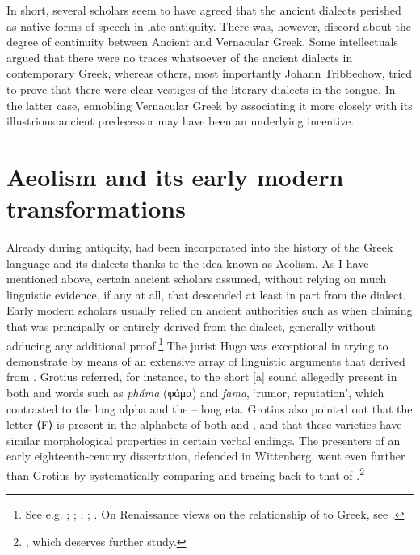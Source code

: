 In short, several scholars seem to have agreed that the ancient dialects perished as native forms of speech in late antiquity. There was, however, discord about the degree of continuity between Ancient and Vernacular Greek. Some intellectuals argued that there were no traces whatsoever of the ancient dialects in contemporary Greek, whereas others, most importantly Johann Tribbechow, tried to prove that there were clear vestiges of the literary dialects in the  tongue. In the latter case, ennobling Vernacular Greek by associating it more closely with its illustrious ancient predecessor may have been an underlying incentive.

\section{Aeolism and its early modern transformations}\label{sec:5.6}

Already during antiquity,  had been incorporated into the history of the Greek language and its dialects thanks to the idea known as Aeolism. As I have mentioned above, certain ancient scholars assumed, without relying on much linguistic evidence, if any at all, that  descended at least in part from the  dialect. Early modern scholars usually relied on ancient authorities such as  when claiming that  was principally or entirely derived from the  dialect, generally without adducing any additional proof.\footnote{See e.g. \citet[84]{Crinesius1629}; \citet[\textsc{xvii}]{Bentley1726}; \citet[76, 106]{Hemsterhuis2015}; \citet[30]{Munthe1748}; \citet[215--216]{Simonis1752}. On Renaissance views on the relationship of  to Greek, see \citet{Tavoni1986}.} The  jurist Hugo \citet[144--146]{Grotius1648} was exceptional in trying to demonstrate by means of an extensive array of linguistic arguments that  derived from . Grotius referred, for instance, to the short [a] sound allegedly present in both  and  words such as \textit{pháma} (φάμα) and \textit{fama}, ‘rumor, reputation’, which contrasted to the  long alpha and the – long eta. Grotius also pointed out that the letter  ⟨F⟩ is present in the alphabets of both  and , and that these varieties have similar morphological properties in certain verbal endings. The presenters of an early eighteenth-century dissertation, defended in Wittenberg, went even further than Grotius by systematically comparing and tracing back   to that of .\footnote{\citet{ThryllitschBrunner1709}, which deserves further study.}

